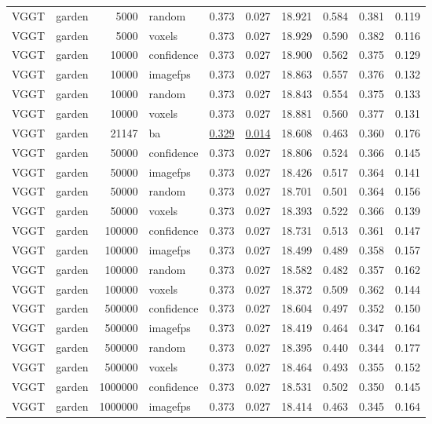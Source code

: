 \begin{table}[H]
\begin{tabular}{llrlrrrrrr}
VGGT & garden & 5000 & random & 0.373 & 0.027 & 18.921 & 0.584 & 0.381 & 0.119 \\
VGGT & garden & 5000 & voxels & 0.373 & 0.027 & 18.929 & 0.590 & 0.382 & 0.116 \\
VGGT & garden & 10000 & confidence & 0.373 & 0.027 & 18.900 & 0.562 & 0.375 & 0.129 \\
VGGT & garden & 10000 & imagefps & 0.373 & 0.027 & 18.863 & 0.557 & 0.376 & 0.132 \\
VGGT & garden & 10000 & random & 0.373 & 0.027 & 18.843 & 0.554 & 0.375 & 0.133 \\
VGGT & garden & 10000 & voxels & 0.373 & 0.027 & 18.881 & 0.560 & 0.377 & 0.131 \\
VGGT & garden & 21147 & ba & \underline{0.329} & \underline{0.014} & 18.608 & 0.463 & 0.360 & 0.176 \\
VGGT & garden & 50000 & confidence & 0.373 & 0.027 & 18.806 & 0.524 & 0.366 & 0.145 \\
VGGT & garden & 50000 & imagefps & 0.373 & 0.027 & 18.426 & 0.517 & 0.364 & 0.141 \\
VGGT & garden & 50000 & random & 0.373 & 0.027 & 18.701 & 0.501 & 0.364 & 0.156 \\
VGGT & garden & 50000 & voxels & 0.373 & 0.027 & 18.393 & 0.522 & 0.366 & 0.139 \\
VGGT & garden & 100000 & confidence & 0.373 & 0.027 & 18.731 & 0.513 & 0.361 & 0.147 \\
VGGT & garden & 100000 & imagefps & 0.373 & 0.027 & 18.499 & 0.489 & 0.358 & 0.157 \\
VGGT & garden & 100000 & random & 0.373 & 0.027 & 18.582 & 0.482 & 0.357 & 0.162 \\
VGGT & garden & 100000 & voxels & 0.373 & 0.027 & 18.372 & 0.509 & 0.362 & 0.144 \\
VGGT & garden & 500000 & confidence & 0.373 & 0.027 & 18.604 & 0.497 & 0.352 & 0.150 \\
VGGT & garden & 500000 & imagefps & 0.373 & 0.027 & 18.419 & 0.464 & 0.347 & 0.164 \\
VGGT & garden & 500000 & random & 0.373 & 0.027 & 18.395 & 0.440 & 0.344 & 0.177 \\
VGGT & garden & 500000 & voxels & 0.373 & 0.027 & 18.464 & 0.493 & 0.355 & 0.152 \\
VGGT & garden & 1000000 & confidence & 0.373 & 0.027 & 18.531 & 0.502 & 0.350 & 0.145 \\
VGGT & garden & 1000000 & imagefps & 0.373 & 0.027 & 18.414 & 0.463 & 0.345 & 0.164 \\

\end{tabular}
\end{table}
